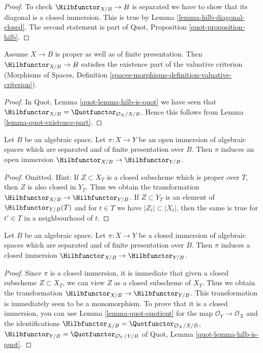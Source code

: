 \begin{proof}
To check $\Hilbfunctor_{X/B} \to B$ is separated we have to
show that its diagonal is a closed immersion. This
is true by Lemma \ref{lemma-hilb-diagonal-closed}.
The second statement is part of
Quot, Proposition \ref{quot-proposition-hilb}.
\end{proof}

\begin{lemma}
\label{lemma-hilb-existence-part}
Assume $X \to B$ is proper as well as of finite presentation.
Then $\Hilbfunctor_{X/B} \to B$ satisfies the existence part
of the valuative criterion (Morphisms of Spaces, Definition
\ref{spaces-morphisms-definition-valuative-criterion}).
\end{lemma}

\begin{proof}
In Quot, Lemma \ref{quot-lemma-hilb-is-quot} we have seen that
$\Hilbfunctor_{X/B} = \Quotfunctor_{\mathcal{O}_X/X/B}$.
Hence this follows from Lemma \ref{lemma-quot-existence-part}.
\end{proof}

\begin{lemma}
\label{lemma-hilb-open}
Let $B$ be an algebraic space. Let $\pi : X \to Y$ be an open immersion
of algebraic spaces which are separated and of finite presentation over $B$.
Then $\pi$ induces an open immersion
$\Hilbfunctor_{X/B} \to \Hilbfunctor_{Y/B}$.
\end{lemma}

\begin{proof}
Omitted. Hint: If $Z \subset X_T$ is a closed subscheme which is
proper over $T$, then $Z$ is also closed in $Y_T$. Thus we obtain
the transformation $\Hilbfunctor_{X/B} \to \Hilbfunctor_{Y/B}$.
If $Z \subset Y_T$ is an element of $\Hilbfunctor_{Y/B}(T)$
and for $t \in T$ we have $|Z_t| \subset |X_t|$,
then the same is true for $t' \in T$ in a neighbourhood of $t$.
\end{proof}

\begin{lemma}
\label{lemma-hilb-closed}
Let $B$ be an algebraic space. Let $\pi : X \to Y$ be a closed immersion
of algebraic spaces which are separated and of finite presentation
over $B$. Then $\pi$ induces a closed immersion
$\Hilbfunctor_{X/B} \to \Hilbfunctor_{Y/B}$.
\end{lemma}

\begin{proof}
Since $\pi$ is a closed immersion, it is immediate that given a
closed subscheme $Z \subset X_T$,
we can view $Z$ as a closed subscheme of $X_T$. Thus we obtain
the transformation $\Hilbfunctor_{X/B} \to \Hilbfunctor_{Y/B}$.
This transformation is immediately seen to be a monomorphism.
To prove that it is a closed immersion, you can use
Lemma \ref{lemma-quot-quotient} for the map
$\mathcal{O}_Y \to \mathcal{O}_X$ and the identifications
$\Hilbfunctor_{X/B} = \Quotfunctor_{\mathcal{O}_X/X/B}$,
$\Hilbfunctor_{Y/B} = \Quotfunctor_{\mathcal{O}_Y/Y/B}$
of Quot, Lemma \ref{quot-lemma-hilb-is-quot}.
\end{proof}

